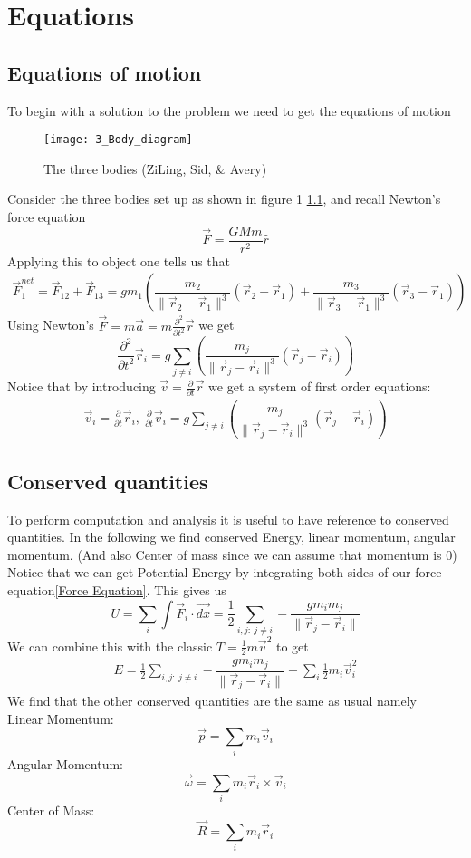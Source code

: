\chapter{Equations}

\section{Equations of motion}
To begin with a solution to the problem we need to get the equations of motion\\
\begin{figure}[h]
\centering
\texttt{[image: 3\_Body\_diagram]}
\label{fig:1}\caption{The three bodies (ZiLing, Sid, \& Avery)}
\end{figure}

Consider the three bodies set up as shown in figure 1 \ref{fig:1}, and recall Newton's force equation \[\vec{F} = \dfrac{GMm}{r^2}\hat{r}\]
Applying this to object one tells us that \begin{align}
\vec{F}^{net}_1 = \vec{F}_{12} + \vec{F}_{13} = gm_1\left(\dfrac{m_2}{\|\vec{r}_2 - \vec{r}_1\|^3}(\vec{r}_2 - \vec{r}_1) + \dfrac{m_3}{\|\vec{r}_3 - \vec{r}_1\|^3}(\vec{r}_3 - \vec{r}_1)\right) \label{Force Equation}
\end{align}
Using Newton's $\vec{F} = m\vec{a} = m\frac{\partial^2}{\partial t^2}\vec{r}$ we get
\[\frac{\partial^2}{\partial t^2}\vec{r}_i = g\sum_{j\ne i}\left(\dfrac{m_j}{\|\vec{r}_j - \vec{r}_i\|^3}(\vec{r}_j - \vec{r}_i)\right)\]
Notice that by introducing $\vec{v} = \frac{\partial}{\partial t}\vec{r}$ we get a system of first order equations:
\begin{align}
\vec{v}_i = \frac{\partial}{\partial t}\vec{r}_i,\ \frac{\partial}{\partial t}\vec{v}_i = g\sum_{j\ne i}\left(\dfrac{m_j}{\|\vec{r}_j - \vec{r}_i\|^3}(\vec{r}_j - \vec{r}_i)\right) \label{Main differential equation}
\end{align}

\section{Conserved quantities}
To perform computation and analysis it is useful to have reference to conserved quantities. In the following we find conserved Energy, linear momentum, angular momentum. (And also Center of mass since we can assume that momentum is 0)\\

Notice that we can get Potential Energy by integrating both sides of our force equation\ref{Force Equation}. This gives us
\[U = \sum_{i}\int\vec{F}_i\cdot\vec{dx} = \frac{1}{2}\sum_{i,j:\ j\ne i}-\dfrac{gm_im_j}{\|\vec{r}_j - \vec{r}_i\|}\]
We can combine this with the classic $T = \frac{1}{2}m\vec{v}^2$ to get
\begin{align}
E = \frac{1}{2}\sum_{i,j:\ j\ne i}-\dfrac{gm_im_j}{\|\vec{r}_j - \vec{r}_i\|} + \sum_{i}\frac{1}{2}m_i\vec{v}_i^2
\end{align}
We find that the other conserved quantities are the same as usual namely\\
Linear Momentum: \[\vec{p} = \sum_{i}m_i\vec{v}_i\]
Angular Momentum: \[\vec{\omega} =  \sum_{i}m_i\vec{r}_i\times\vec{v}_i\]
Center of Mass: \[\vec{R} = \sum_{i}m_i\vec{r}_i\]


